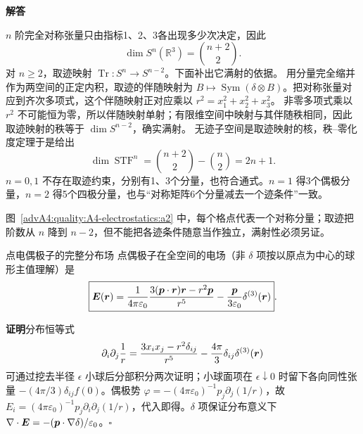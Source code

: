 \begin{advsolution}
\begin{center}\begin{minipage}{.96\linewidth}\centering
\raggedright{\bfseries\color{DeepBlue}解答}\par\smallskip\centering

\label{advA4:quality:A4-electrostatics:a2}
\end{minipage}\end{center}

$n$ 阶完全对称张量只由指标1、2、3各出现多少次决定，因此
\[
 \dim S^n(\mathbb R^3)=\binom{n+2}{2}.
\]
对 $n\ge2$，取迹映射 $\operatorname{Tr}:S^n\to S^{n-2}$。下面补出它满射的依据。
用分量完全缩并作为两空间的正定内积，取迹的伴随映射为
$B\mapsto\operatorname{Sym}(\delta\otimes B)$。把对称张量对应到齐次多项式，这个伴随映射正对应乘以 $r^2=x_1^2+x_2^2+x_3^2$。
非零多项式乘以 $r^2$ 不可能恒为零，所以伴随映射单射；有限维空间中映射与其伴随秩相同，因此取迹映射的秩等于 $\dim S^{n-2}$，确实满射。
无迹子空间是取迹映射的核，秩--零化度定理于是给出
\[
 \dim\operatorname{STF}^n
 =\binom{n+2}{2}-\binom n2
 =\boxed{2n+1}.
\]
$n=0,1$ 不存在取迹约束，分别有1、3个分量，也符合通式。$n=1$ 得3个偶极分量，$n=2$ 得5个四极分量，也与“对称矩阵6个分量减去一个迹条件”一致。

图~\ref{advA4:quality:A4-electrostatics:a2} 中，每个格点代表一个对称分量；取迹把阶数从 $n$ 降到 $n-2$，但不能把各迹条件随意当作独立，满射性必须另证。
\end{advsolution}

\begin{advtheorem}{点电偶极子的完整分布场}\label{advA4:thm:dipole-distribution-field}
点偶极子在全空间的电场（非 $\delta$ 项按以原点为中心的球形主值理解）是
\[
 \boxed{\bm{E}(\bm{r})=\frac1{4\pi\varepsilon_0}
 \frac{3(\bm{p}\cdot\bm{r})\bm{r}-r^2\bm{p}}{r^5}
 -\frac{\bm{p}}{3\varepsilon_0}\delta^{(3)}(\bm{r})}.
\]
\end{advtheorem}
\noindent\textbf{证明}\quad 分布恒等式
\[
 \partial_i\partial_j\frac1r
 =\frac{3x_ix_j-r^2\delta_{ij}}{r^5}
 -\frac{4\pi}{3}\delta_{ij}\delta^{(3)}(\bm{r})
\]
可通过挖去半径 $\epsilon$ 小球后分部积分两次证明；小球面项在
$\epsilon\downarrow0$ 时留下各向同性张量
$-(4\pi/3)\delta_{ij}f(0)$。偶极势
$\varphi=-(4\pi\varepsilon_0)^{-1}p_j\partial_j(1/r)$，故
$E_i=(4\pi\varepsilon_0)^{-1}p_j\partial_i\partial_j(1/r)$，代入即得。$\delta$ 项保证分布意义下
$\nabla\cdot\bm{E}=-(\bm{p}\cdot\nabla\delta)/\varepsilon_0$。\hfill$\square$

